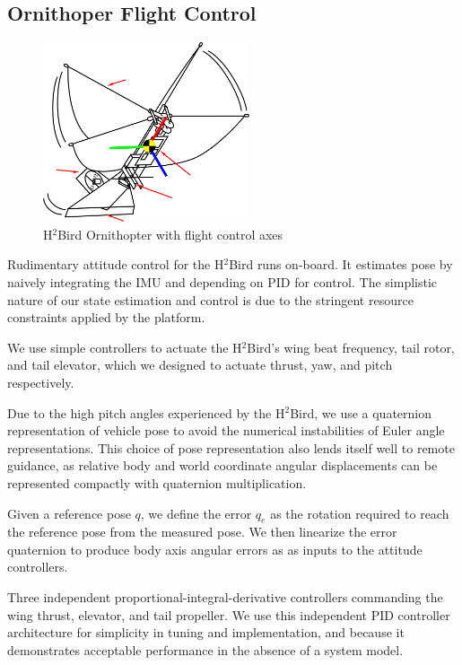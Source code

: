 \documentclass{aamas2013}
\begin{document}
\subsection{Ornithoper Flight Control}

\begin{figure}[tb]
\centering
\includegraphics[height=150pt]{figures/h2bird_axes.png}
\caption{H$^2$Bird Ornithopter with flight control axes}
\label{fig:h2Bird_axes}
\end{figure}

Rudimentary attitude control for the H$^2$Bird runs on-board. It estimates 
pose by naively integrating the IMU and depending on PID for control. The 
simplistic nature of our state estimation and control is due to the 
stringent resource constraints applied by the platform.

We use simple controllers to actuate the H$^2$Bird's wing beat frequency, 
tail rotor, and tail elevator, which we designed to actuate thrust, yaw, 
and pitch respectively.

Due to the high pitch angles experienced by the H$^2$Bird, we use a 
quaternion representation of vehicle pose to avoid the numerical 
instabilities of Euler angle representations. This choice of pose 
representation also lends itself well to remote guidance, as relative body 
and world coordinate angular displacements can be represented compactly 
with quaternion multiplication.  

Given a reference pose $q$, we define the error $q_e$ as the rotation 
required to reach the reference pose from the measured pose. We then 
linearize the error quaternion to produce body axis angular errors as as 
inputs to the attitude controllers. 

Three independent proportional-integral-derivative controllers commanding 
the wing thrust, elevator, and tail propeller. We use this independent PID 
controller architecture for simplicity in tuning and implementation, and 
because it demonstrates acceptable performance in the absence of a system 
model.
\end{document}
